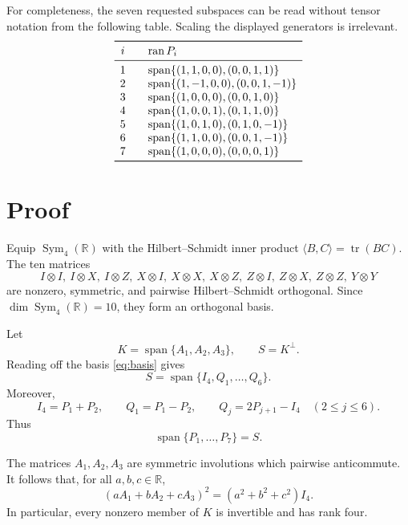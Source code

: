 \documentclass[11pt]{article}
\newcommand{\R}{\mathbb R}
\newcommand{\Sym}{\operatorname{Sym}}
\newcommand{\spn}{\operatorname{span}}
\begin{document}
For completeness, the seven requested subspaces can be read without tensor
notation from the following table.  Scaling the displayed generators is
irrelevant.
\[
\begin{array}{c@{\qquad}l}
\toprule
i&\operatorname{ran}P_i\\
\midrule
1&\spn\{(1,1,0,0),(0,0,1,1)\}\\
2&\spn\{(1,-1,0,0),(0,0,1,-1)\}\\
3&\spn\{(1,0,0,0),(0,0,1,0)\}\\
4&\spn\{(1,0,0,1),(0,1,1,0)\}\\
5&\spn\{(1,0,1,0),(0,1,0,-1)\}\\
6&\spn\{(1,1,0,0),(0,0,1,-1)\}\\
7&\spn\{(1,0,0,0),(0,0,0,1)\}\\
\bottomrule
\end{array}
\]

\section*{Proof}

Equip \(\Sym_4(\R)\) with the Hilbert--Schmidt inner product
\(\langle B,C\rangle=\operatorname{tr}(BC)\).  The ten matrices
\begin{equation}\label{eq:basis}
 I\otimes I,\ I\otimes X,\ I\otimes Z,\ X\otimes I,\ X\otimes X,
 \ X\otimes Z,\ Z\otimes I,\ Z\otimes X,\ Z\otimes Z,\ Y\otimes Y
\end{equation}
are nonzero, symmetric, and pairwise Hilbert--Schmidt orthogonal.  Since
\(\dim\Sym_4(\R)=10\), they form an orthogonal basis.

Let
\[
 K=\spn\{A_1,A_2,A_3\},\qquad S=K^\perp.
\]
Reading off the basis \eqref{eq:basis} gives
\begin{equation}\label{eq:S}
 S=\spn\{I_4,Q_1,\ldots,Q_6\}.
\end{equation}
Moreover,
\[
 I_4=P_1+P_2,\qquad Q_1=P_1-P_2,
 \qquad Q_j=2P_{j+1}-I_4\quad(2\leq j\leq6).
\]
Thus
\begin{equation}\label{eq:span}
 \spn\{P_1,\ldots,P_7\}=S.
\end{equation}

The matrices \(A_1,A_2,A_3\) are symmetric involutions which pairwise
anticommute.  It follows that, for all \(a,b,c\in\R\),
\begin{equation}\label{eq:clifford}
 (aA_1+bA_2+cA_3)^2=(a^2+b^2+c^2)I_4.
\end{equation}
In particular, every nonzero member of \(K\) is invertible and has rank four.
\end{document}
